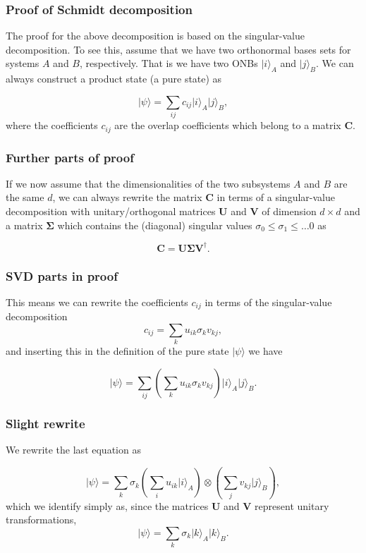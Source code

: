 \documentclass{beamer}
\begin{document}
\begin{frame}
\frametitle{Proof of Schmidt decomposition}

The proof for the above decomposition is based on the singular-value
decomposition. To see this, assume that we have two orthonormal bases
sets for systems $A$ and $B$, respectively. That is we have two ONBs
$\vert i\rangle_A$ and $\vert j\rangle_B$. We can always construct a
product state (a pure state) as

\[ \vert\psi \rangle = \sum_{ij} c_{ij}\vert i\rangle_A\vert
j\rangle_B,
\]
where the coefficients $c_{ij}$ are the overlap coefficients which
belong to a matrix $\bm{C}$.
\end{frame}

\begin{frame}
\frametitle{Further parts of proof}

If we now assume that the
dimensionalities of the two subsystems $A$ and $B$ are the same $d$,
we can always rewrite the matrix $\bm{C}$ in terms of a singular-value
decomposition with unitary/orthogonal matrices $\bm{U}$ and $\bm{V}$
of dimension $d\times d$ and a matrix $\bm{\Sigma}$ which contains the
(diagonal) singular values $\sigma_0\leq \sigma_1 \leq \dots 0$ as

\[
\bm{C}=\bm{U}\bm{\Sigma}\bm{V}^{\dagger}.
\]
\end{frame}

\begin{frame}
\frametitle{SVD parts in proof}

This means we can rewrite the coefficients $c_{ij}$ in terms of the singular-value decomposition
\[
c_{ij}=\sum_k u_{ik}\sigma_kv_{kj},
\]
and inserting this in the definition of the pure state $\vert \psi\rangle$ we have

\[
\vert\psi \rangle = \sum_{ij} \left(\sum_k u_{ik}\sigma_kv_{kj} \right)\vert i\rangle_A\vert j\rangle_B.
\]
\end{frame}

\begin{frame}
\frametitle{Slight rewrite}

We rewrite the last equation as

\[
\vert\psi \rangle = \sum_{k}\sigma_k \left(\sum_i u_{ik}\vert i\rangle_A\right)\otimes\left(\sum_jv_{kj}\vert j\rangle_B\right),
\]
which we identify simply as, since the matrices $\bm{U}$ and $\bm{V}$ represent unitary transformations,
\[
\vert\psi \rangle = \sum_{k}\sigma_k \vert k\rangle_A\vert k\rangle_B.
\]
\end{frame}
\end{document}
